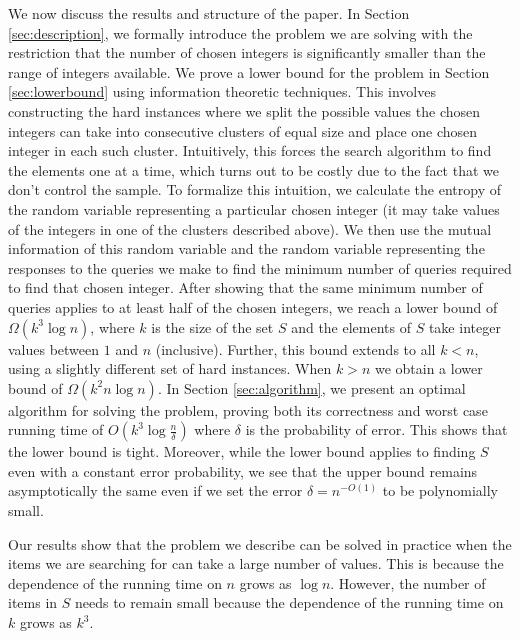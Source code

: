 \documentclass[12pt]{article}
\newcommand{\Om}{\Omega}
\newcommand{\de}{\delta}
\begin{document}
We now discuss the results and structure of the paper. In Section \ref{sec:description}, we formally introduce the problem we are solving with the restriction that the number of chosen integers is significantly smaller than the range of integers available. We prove a lower bound for the problem in Section \ref{sec:lowerbound} using information theoretic techniques. This involves constructing the hard instances where we split the possible values the chosen integers can take into consecutive clusters of equal size and place one chosen integer in each such cluster. Intuitively, this forces the search algorithm to find the elements one at a time, which turns out to be costly due to the fact that we don't control the sample. To formalize this intuition, we calculate the entropy of the random variable representing a particular chosen integer (it may take values of the integers in one of the clusters described above). We then use the mutual information of this random variable and the random variable representing the responses to the queries we make to find the minimum number of queries required to find that chosen integer. After showing that the same minimum number of queries applies to at least half of the chosen integers, we reach a lower bound of $\Omega(k^3 \log{n})$, where $k$ is the size of the set $S$ and the elements of $S$  take integer values between $1$ and $n$ (inclusive). Further, this bound extends to all $k<n$, using a slightly different set of hard instances. When $k>n$ we obtain a lower bound of $\Om(k^2 n\log n)$.  In Section \ref{sec:algorithm}, we present an optimal algorithm for solving the problem, proving both its correctness and worst case running time of $O(k^3 \log{\frac{n}{\delta}})$ where $\delta$ is the probability of error. This shows that the lower bound is tight. Moreover, while the lower bound applies to finding $S$ even with a constant error probability, we see that the upper bound remains asymptotically the same even if we set the error $\de=n^{-O(1)}$ to be polynomially small.  

Our results show that the problem we describe can be solved in practice when the items we are searching for can take a large number of values. This is because the dependence of the running time on $n$ grows as $\log{n}$. However, the number of items in $S$ needs to remain small because the dependence of the running time on $k$ grows as $k^3$. 
\end{document}
